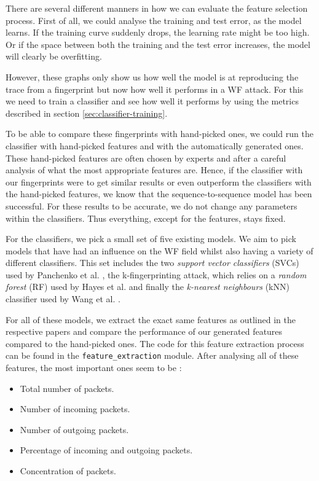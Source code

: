 There are several different manners in how we can evaluate the feature selection process.
First of all, we could analyse the training and test error, as the model learns.
If the training curve suddenly drops, the learning rate might be too high.
Or if the space between both the training and the test error increases, the model will clearly be overfitting.

However, these graphs only show us how well the model is at reproducing the trace from a fingerprint but now how well it performs in a WF attack.
For this we need to train a classifier and see how well it performs by using the metrics described in section \ref{sec:classifier-training}.

To be able to compare these fingerprints with hand-picked ones, we could run the classifier with hand-picked features and with the automatically generated ones.
These hand-picked features are often chosen by experts and after a careful analysis of what the most appropriate features are.
Hence, if the classifier with our fingerprints were to get similar results or even outperform the classifiers with the hand-picked features, we know that the sequence-to-sequence model has been successful.
For these results to be accurate, we do not change any parameters within the classifiers.
Thus everything, except for the features, stays fixed.

For the classifiers, we pick a small set of five existing models.
We aim to pick models that have had an influence on the WF field whilst also having a variety of different classifiers.
This set includes the two \textit{support vector classifiers} (SVCs) used by Panchenko et al. \cite{panchenko1,panchenko2},
the k-fingerprinting attack, which relies on a \textit{random forest} (RF) used by Hayes et al. \cite{kfingerprinting}
and finally the \textit{k-nearest neighbours} (kNN) classifier used by Wang et al. \cite{wang_cai_johnson_nithyanand_goldberg_2014}.

For all of these models, we extract the exact same features as outlined in the respective papers and compare the performance of our generated features compared to the hand-picked ones.
The code for this feature extraction process can be found in the \texttt{feature\_extraction} module.
After analysing all of these features, the most important ones seem to be \cite{panchenko1,panchenko2,kfingerprinting,wang_cai_johnson_nithyanand_goldberg_2014}:

\begin{itemize}
  \item Total number of packets.
  \item Number of incoming packets.
  \item Number of outgoing packets.
  \item Percentage of incoming and outgoing packets.
  \item Concentration of packets.
\end{itemize}

